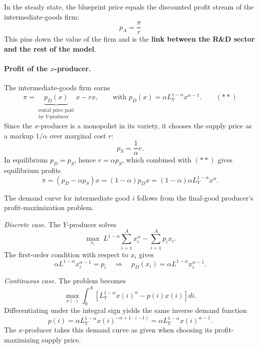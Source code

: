 \begin{tcolorbox}[
    colback=red!1!white,
    colframe=red!40!white,
    title=Key Result: Price of a Blueprint,
    fonttitle=\bfseries
    ]
In the steady state, the blueprint price equals the discounted profit stream of the intermediate-goods firm:
\[
    \boxed{\, p_A = \frac{\pi}{r} \,}
\]
This pins down the value of the firm and is the \textbf{link between the R\&D sector and the rest of the model}.
\end{tcolorbox}

\paragraph{Profit of the $x$-producer.} The intermediate-goods firm earns
\[
    \pi = \underbrace{p_D(x)}_{\substack{\text{rental price paid}\\\text{by }Y\text{-producer}}} x - r x, \qquad \text{with } p_D(x) = \alpha L_Y^{1-\alpha} x^{\alpha-1}. \qquad (**)
\]
Since the $x$-producer is a monopolist in its variety, it chooses the supply price as a markup $1/\alpha$ over marginal cost $r$:
\[
    p_S = \frac{1}{\alpha} r.
\]
In equilibrium $p_D = p_S$, hence $r = \alpha p_S$, which combined with $(**)$ gives equilibrium profits
\[
    \pi = (p_D - \alpha p_S) x = (1-\alpha) p_D x = (1-\alpha)\alpha L_Y^{1-\alpha} x^\alpha.
\]

\begin{tcolorbox}[
    colback=blue!1!white,
    colframe=blue!40!white,
    title=Derivation: Demand Curve $p_D(x) = \alpha L_Y^{1-\alpha} x^{\alpha-1}$,
    fonttitle=\bfseries
    ]
The demand curve for intermediate good $i$ follows from the final-good producer's profit-maximization problem.

\textit{Discrete case.} The $Y$-producer solves
\[
    \max_{x_i} \; L^{1-\alpha} \sum_{i=1}^A x_i^\alpha - \sum_{i=1}^A p_i x_i.
\]
The first-order condition with respect to $x_i$ gives
\[
    \alpha L^{1-\alpha} x_i^{\alpha-1} = p_i \quad \Longrightarrow \quad p_D(x_i) = \alpha L^{1-\alpha} x_i^{\alpha-1}.
\]

\textit{Continuous case.} The problem becomes
\[
    \max_{x(\cdot)} \int_0^A \left[ L_Y^{1-\alpha} x(i)^\alpha - p(i) x(i) \right] di.
\]
Differentiating under the integral sign yields the same inverse demand function
\[
    p(i) = \alpha L_Y^{1-\alpha} x(i)^{-\alpha+1\cdot(-1)} = \alpha L_Y^{1-\alpha} x(i)^{\alpha-1}.
\]
The $x$-producer takes this demand curve as given when choosing its profit-maximizing supply price.
\end{tcolorbox}

